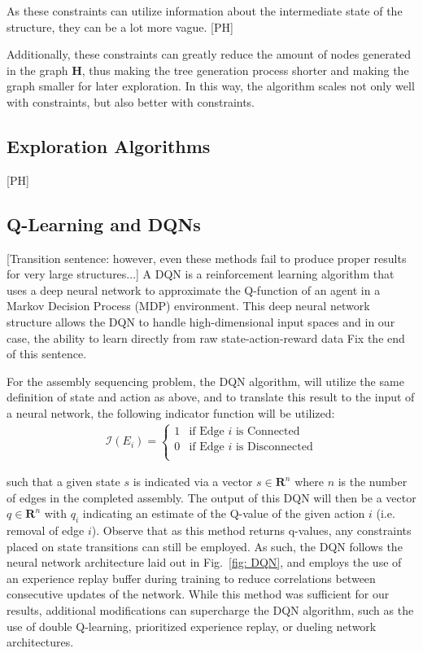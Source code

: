 \documentclass{article}
\begin{document}
As these constraints can utilize information about the intermediate state of the structure, they can be a lot more vague. {\color{red}[PH]}

Additionally, these constraints can greatly reduce the amount of nodes generated in the graph $\mathbf{H}$, thus making the tree generation process shorter and making the graph smaller for later exploration. In this way, the algorithm scales not only well with constraints, but also better with constraints.

\subsection{Exploration Algorithms}
{\color{red}[PH]}

\subsection{Q-Learning and DQNs}
\color{red} [Transition sentence: however, even these methods fail to produce proper results for very large structures...] \color{black} A DQN is a reinforcement learning algorithm that uses a deep neural network to approximate the Q-function of an agent in a Markov Decision Process (MDP) environment. This deep neural network structure allows the DQN to handle high-dimensional input spaces and in our case, the ability to learn directly from raw state-action-reward data {\color{red}Fix the end of this sentence}.

For the assembly sequencing problem, the DQN algorithm, will utilize the same definition of state and action as above, and to translate this result to the input of a neural network, the following indicator function will be utilized:
\begin{align*}
    \mathcal{I}(E_i) = 
    \begin{cases}
        1 & \text{if Edge } i \text{ is Connected}\\
        0 & \text{if Edge } i \text{ is Disconnected}\\
    \end{cases}
\end{align*}

such that a given state $s$ is indicated via a vector $s \in \mathbf{R}^n$ where $n$ is the number of edges in the completed assembly. The output of this DQN will then be a vector $q \in \mathbf{R}^n$ with $q_i$ indicating an estimate of the Q-value of the given action $i$ (i.e. removal of edge $i$). Observe that as this method returns q-values, any constraints placed on state transitions can still be employed. As such, the DQN follows the neural network architecture laid out in Fig.~\ref{fig: DQN}, and employs the use of an experience replay buffer during training to reduce correlations between consecutive updates of the network. While this method was sufficient for our results, additional modifications can supercharge the DQN algorithm, such as the use of double Q-learning, prioritized experience replay, or dueling network architectures.
\end{document}
